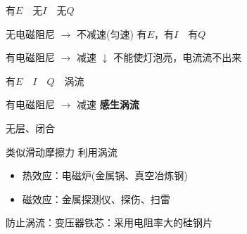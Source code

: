 有$E$　无$I$　无$Q$

无电磁阻尼 $\to$ 不减速(匀速)
有$E$，有$I$　有$Q$

有电磁阻尼 $\to$ 减速
$\downarrow$ 不能使灯泡亮，电流流不出来

有$E$　$I$　$Q$　涡流

有电磁阻尼 $\to$ 减速
\textbf{感生涡流}

无层、闭合

类似滑动摩擦力
利用涡流
\begin{itemize}
  \item 热效应：电磁炉(金属锅、真空冶炼钢)
  \item 磁效应：金属探测仪、探伤、扫雷
\end{itemize}
防止涡流：变压器铁芯：采用电阻率大的硅钢片
